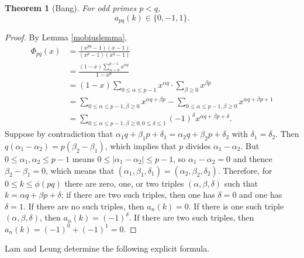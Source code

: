 \documentclass{article}
\newtheorem{theorem}{Theorem}
\theoremstyle{definition}
\begin{document}
\begin{theorem}[Bang]
For odd primes $p<q$,
\[
a_{pq}(k) \in \{0,-1,1\}.
\] 
\end{theorem}
\begin{proof}
By Lemma \ref{mobiuslemma},
\begin{align*}
\Phi_{pq}(x)&=\frac{(x^{pq}-1)(x-1)}{(x^p-1)(x^q-1)}\\
&=\frac{(1-x)\sum_{\alpha=0}^{p-1} x^{\alpha q}}{1-x^p}\\
&=(1-x) \sum_{0 \leq \alpha \leq p-1}  x^{\alpha q} \cdot \sum_{\beta \geq 0} x^{\beta p}\\
&=\sum_{0 \leq \alpha \leq p-1, \beta \geq 0} x^{\alpha q+\beta p}
-\sum_{0 \leq \alpha \leq p-1, \beta \geq 0} x^{\alpha q+\beta p+1}\\
&=\sum_{0 \leq \alpha \leq p-1, \beta \geq 0, 0 \leq \delta \leq 1} (-1)^\delta x^{\alpha q+\beta p+\delta}.
\end{align*}
Suppose by contradiction that $\alpha_1 q+\beta_1 p + \delta_1 = 
\alpha_2 q +\beta_2 p +\delta_2$ with $\delta_1=\delta_2$. Then 
$q(\alpha_1-\alpha_2) = p(\beta_2-\beta_1)$, which implies that $p$ divides $\alpha_1-\alpha_2$. But
$0 \leq \alpha_1,\alpha_2 \leq p-1$ means $0 \leq |\alpha_1-\alpha_2| \leq p-1$, so $\alpha_1-\alpha_2=0$ and thence
$\beta_2-\beta_1=0$, which means that $(\alpha_1,\beta_1,\delta_1)=(\alpha_2,\beta_2,\delta_2)$. 
Therefore, for $0 \leq k \leq \phi(pq)$ there are zero, one, or two triples $(\alpha,\beta,\delta)$ such that
$k=\alpha q + \beta p + \delta$; if there are two such triples, then one has $\delta=0$ and one has $\delta=1$.
If there are no such triples, then $a_n(k)=0$. If there is one such triple $(\alpha,\beta,\delta)$, then $a_n(k)=(-1)^\delta$.
If there are two such triples, then $a_n(k) = (-1)^0+(-1)^1 = 0$. 
\end{proof}


Lam and Leung \cite{lam1996} determine the following explicit formula.
\end{document}
